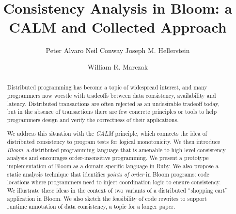 \documentclass{acm_proc_article-sp}
\begin{document}
\title{Consistency Analysis in Bloom: a CALM and Collected Approach}

\author{
\alignauthor
Peter Alvaro
\alignauthor
Neil Conway
\alignauthor
Joseph M. Hellerstein
\and
\alignauthor
William R. Marczak
}

\maketitle

\begin{abstract} 

Distributed programming has become a topic of widespread interest, and many programmers now wrestle with tradeoffs between data consistency, availability and latency.  Distributed transactions are often rejected as an undesirable tradeoff today, but in the absence of transactions there are few concrete principles or tools to help programmers design and verify the correctness of their applications.

We address this situation with the \emph{CALM} principle, which connects the idea of distributed consistency to program tests for logical monotonicity.  We then introduce \emph{Bloom}, a distributed programming language that is amenable to high-level consistency analysis and encourages order-insensitive programming.  We present a prototype implementation of Bloom as a domain-specific language in Ruby. We also propose a static analysis technique that identifies {\em points of order} in Bloom programs: code locations where programmers need to inject coordination logic to ensure consistency.  
We illustrate these ideas in the context of two variants
of a distributed ``shopping cart'' application in Bloom.  We also sketch the feasibility of code rewrites to support runtime annotation of data consistency, a topic for a longer paper.


\end{abstract}
\end{document}
